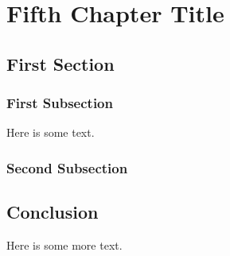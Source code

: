 \chapter{Fifth Chapter Title}
\chaptoc %

\section{First Section}
\subsection{First Subsection}
Here is some text. 

\subsection{Second Subsection}

\section{Conclusion}
Here is some more text. 
